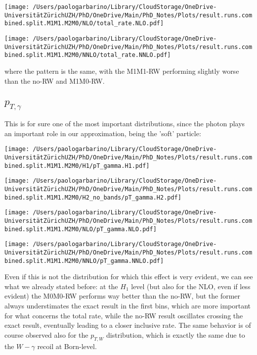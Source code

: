 \documentclass{report}
\begin{document}
\begin{minipage}{0.45\textwidth}
    \centering
    \texttt{[image: /Users/paologarbarino/Library/CloudStorage/OneDrive-UniversitätZürichUZH/PhD/OneDrive/Main/PhD\_Notes/Plots/result.runs.combined.split.M1M1.M2M0/NLO/total\_rate.NLO.pdf]}
\end{minipage}
\hfill
\begin{minipage}{0.45\textwidth}
    \centering
    \texttt{[image: /Users/paologarbarino/Library/CloudStorage/OneDrive-UniversitätZürichUZH/PhD/OneDrive/Main/PhD\_Notes/Plots/result.runs.combined.split.M1M1.M2M0/NNLO/total\_rate.NNLO.pdf]}
\end{minipage}

where the pattern is the same, with the M1M1-RW performing slightly worse than the no-RW and M1M0-RW.

\subsection{$p_{T,\gamma}$}
This is for sure one of the most important distributions, since the photon plays an important role in our approximation, being the 'soft' particle:

\begin{minipage}{0.45\textwidth}
    \centering
    \texttt{[image: /Users/paologarbarino/Library/CloudStorage/OneDrive-UniversitätZürichUZH/PhD/OneDrive/Main/PhD\_Notes/Plots/result.runs.combined.split.M1M1.M2M0/H1/pT\_gamma.H1.pdf]}
\end{minipage}
\hfill
\begin{minipage}{0.45\textwidth}
    \centering
    \texttt{[image: /Users/paologarbarino/Library/CloudStorage/OneDrive-UniversitätZürichUZH/PhD/OneDrive/Main/PhD\_Notes/Plots/result.runs.combined.split.M1M1.M2M0/H2\_no\_bands/pT\_gamma.H2.pdf]}
\end{minipage}

\begin{minipage}{0.45\textwidth}
    \centering
    \texttt{[image: /Users/paologarbarino/Library/CloudStorage/OneDrive-UniversitätZürichUZH/PhD/OneDrive/Main/PhD\_Notes/Plots/result.runs.combined.split.M1M1.M2M0/NLO/pT\_gamma.NLO.pdf]}
\end{minipage}
\hfill
\begin{minipage}{0.45\textwidth}
    \centering
    \texttt{[image: /Users/paologarbarino/Library/CloudStorage/OneDrive-UniversitätZürichUZH/PhD/OneDrive/Main/PhD\_Notes/Plots/result.runs.combined.split.M1M1.M2M0/NNLO/pT\_gamma.NNLO.pdf]}
\end{minipage}

Even if this is not the distribution for which this effect is very evident, we can see what we already stated before: at the $H_1$ level (but also for the NLO, even if less evident) the M0M0-RW performs way better than the no-RW, but the former always understimates the exact result in the first bins,
which are more important for what concerns the total rate, while the no-RW result oscillates crossing the exact result, eventually leading to a closer inclusive rate. The same behavior is of course observed also for the $p_{T,W}$ distribution, which is exactly the same due to the $W-\gamma$ recoil at Born-level.
\end{document}
